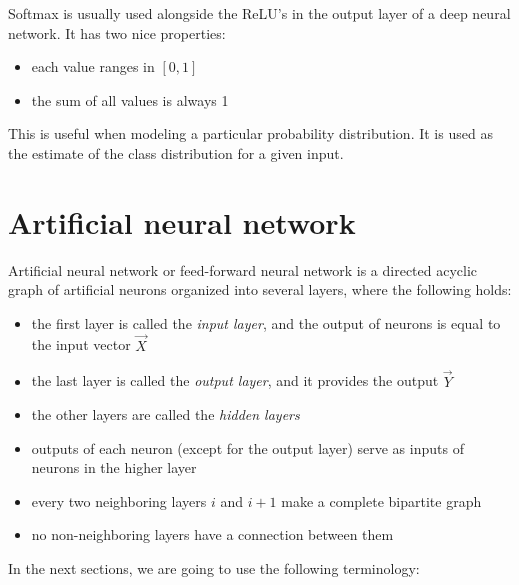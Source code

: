 \noindent
Softmax is usually used alongside the ReLU's in the output layer of a deep neural network. It has two nice properties:

\begin{itemize}

\item each value ranges in $[0, 1]$
\item the sum of all values is always 1

\end{itemize}

This is useful when modeling a particular probability distribution. It is used as the estimate of the class distribution for a given input.

\section{Artificial neural network}

Artificial neural network\cite{nn_book} or feed-forward neural network is a directed acyclic graph of artificial neurons organized into several layers, where the following holds:

\begin{itemize}

\item the first layer is called the \textit{input layer}, and the output of neurons is equal to the input vector $\overrightarrow{X}$

\item the last layer is called the \textit{output layer}, and it provides the output $\overrightarrow{Y}$

\item the other layers are called the \textit{hidden layers}

\item outputs of each neuron (except for the output layer) serve as inputs of neurons in the higher layer

\item every two neighboring layers $i$ and $i+1$ make a complete bipartite graph

\item no non-neighboring layers have a connection between them

\end{itemize}

\noindent
In the next sections, we are going to use the following terminology:

